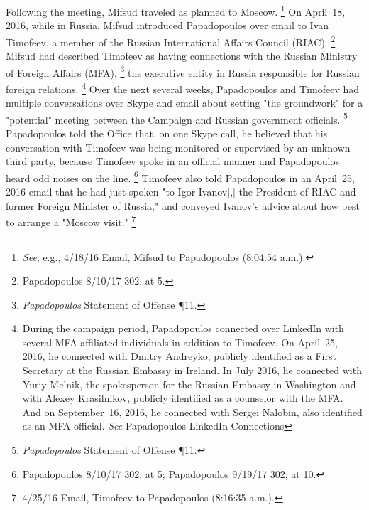 Following the meeting, Mifsud traveled as planned to Moscow.%
\footnote{\textit{See}, e.g., 4/18/16 Email, Mifsud to Papadopoulos (8:04:54 a.m.).}
On April~18, 2016, while in Russia, Mifsud introduced Papadopoulos over email to Ivan Timofeev, a member of the Russian International Affairs Council (RIAC).%
\footnote{Papadopoulos 8/10/17 302, at 5.}
Mifsud had described Timofeev as having connections with the Russian Ministry of Foreign Affairs (MFA),%
\footnote{\textit{Papadopoulos} Statement of Offense \P 11.}
the executive entity in Russia responsible for Russian foreign relations.%
\footnote{During the campaign period, Papadopoulos connected over LinkedIn with several MFA-affiliated individuals in addition to Timofeev.
On April~25, 2016, he connected with Dmitry Andreyko, publicly identified as a First Secretary at the Russian Embassy in Ireland.
In July 2016, he connected with Yuriy Melnik, the spokesperson for the Russian Embassy in Washington and with Alexey Krasilnikov, publicly identified as a counselor with the MFA\null.
And on September~16, 2016, he connected with Sergei Nalobin, also identified as an MFA official.
\textit{See} Papadopoulos LinkedIn Connections }
Over the next several weeks, Papadopoulos and Timofeev had multiple conversations over Skype and email about setting "the groundwork" for a "potential" meeting between the Campaign and Russian government officials.%
\footnote{\textit{Papadopoulos} Statement of Offense \P 11.}
Papadopoulos told the Office that, on one Skype call, he believed that his conversation with Timofeev was being monitored or supervised by an unknown third party, because Timofeev spoke in an official manner and Papadopoulos heard odd noises on the line.%
\footnote{Papadopoulos 8/10/17 302, at 5; Papadopoulos 9/19/17 302, at 10.}
Timofeev also told Papadopoulos in an April~25, 2016 email that he had just spoken "to Igor Ivanov[,] the President of RIAC and former Foreign Minister of Russia," and conveyed Ivanov's advice about how best to arrange a "Moscow visit."%
\footnote{4/25/16 Email, Timofeev to Papadopoulos (8:16:35 a.m.).}

